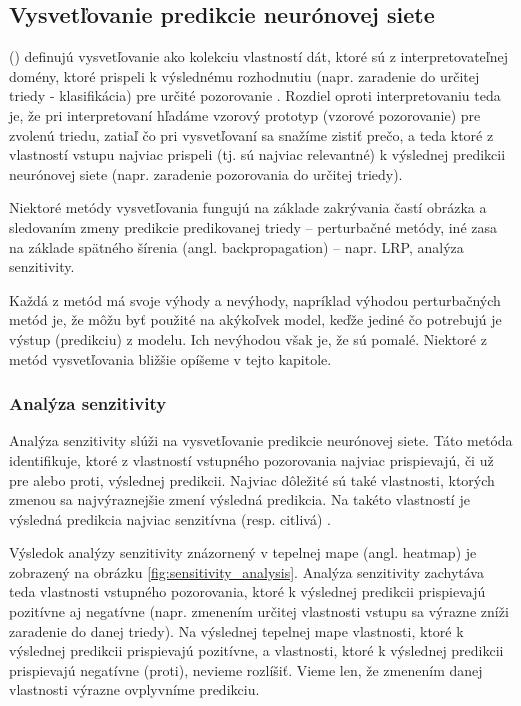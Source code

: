 
\subsection{Vysvetľovanie predikcie neurónovej siete}

\citeauthor{montavon2018methods} (\citeyear{montavon2018methods}) definujú vysvetľovanie ako kolekciu vlastností dát, ktoré sú z interpretovateľnej domény, ktoré prispeli k výslednému rozhodnutiu (napr. zaradenie do určitej triedy - klasifikácia) pre určité pozorovanie \cite{montavon2018methods}. Rozdiel oproti interpretovaniu teda je, že pri interpretovaní hľadáme vzorový prototyp (vzorové pozorovanie) pre zvolenú triedu, zatiaľ čo pri vysvetľovaní sa snažíme zistiť prečo, a teda ktoré z vlastností vstupu najviac prispeli (tj. sú najviac relevantné) k výslednej predikcii neurónovej siete (napr. zaradenie pozorovania do určitej triedy). 

Niektoré metódy vysvetľovania fungujú na základe zakrývania častí obrázka a sledovaním zmeny predikcie predikovanej triedy -- perturbačné metódy, iné zasa na základe spätného šírenia (angl. backpropagation) -- napr. LRP, analýza senzitivity.

Každá z metód má svoje výhody a nevýhody, napríklad výhodou perturbačných metód je, že môžu byť použité na akýkoľvek model, keďže jediné čo potrebujú je výstup (predikciu) z modelu. Ich nevýhodou však je, že sú pomalé. Niektoré z metód vysvetľovania bližšie opíšeme v tejto kapitole.

\subsubsection{Analýza senzitivity}

Analýza senzitivity slúži na vysvetľovanie predikcie neurónovej siete. Táto metóda identifikuje, ktoré z vlastností vstupného pozorovania najviac prispievajú, či už pre alebo proti, výslednej predikcii. Najviac dôležité sú také vlastnosti, ktorých zmenou sa najvýraznejšie zmení výsledná predikcia. Na takéto vlastností je výsledná predikcia najviac senzitívna (resp. citlivá) \cite{montavon2018methods}.

Výsledok analýzy senzitivity znázornený v tepelnej mape (angl. heatmap) je zobrazený na obrázku \ref{fig:sensitivity_analysis}. Analýza senzitivity zachytáva teda vlastnosti vstupného pozorovania, ktoré k výslednej predikcii prispievajú pozitívne aj negatívne (napr. zmenením určitej vlastnosti vstupu sa výrazne zníži zaradenie do danej triedy). Na výslednej tepelnej mape vlastnosti, ktoré k výslednej predikcii prispievajú pozitívne, a vlastnosti, ktoré k výslednej predikcii prispievajú negatívne (proti), nevieme rozlíšiť. Vieme len, že zmenením danej vlastnosti výrazne ovplyvníme predikciu.

